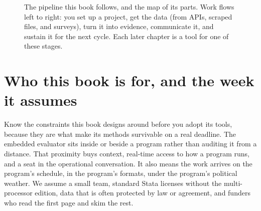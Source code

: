 \documentclass[
    a4paper,
    fontsize=10pt,
    twoside=true,
    numbers=noenddot,
]{kaobook}
\begin{document}
\begin{figure}
\centering
{}
\caption[The embedded evaluator's pipeline]{The pipeline this book follows, and the map of its parts. Work flows left to right: you set up a project, get the data (from APIs, scraped files, and surveys), turn it into evidence, communicate it, and sustain it for the next cycle. Each later chapter is a tool for one of these stages.}
\label{fig:pipeline}
\end{figure}

\section{Who this book is for, and the week it assumes}
Know the constraints this book designs around before you adopt its tools, because they are what make its methods survivable on a real deadline. The embedded evaluator sits inside or beside a program rather than auditing it from a distance. That proximity buys context, real-time access to how a program runs, and a seat in the operational conversation. It also means the work arrives on the program's schedule, in the program's formats, under the program's political weather. We assume a small team, standard Stata licenses without the multi-processor edition, data that is often protected by law or agreement, and funders who read the first page and skim the rest.
\end{document}
